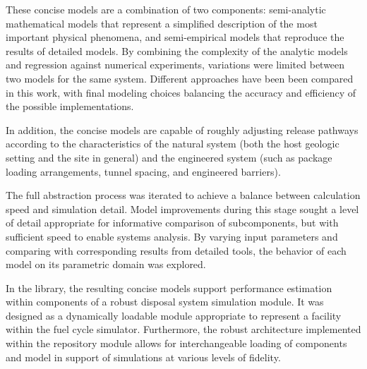 
These concise models are a combination of two components: 
semi-analytic mathematical models that represent a simplified description of 
the most important physical phenomena, and semi-empirical models that reproduce 
the results of detailed models.  By combining the complexity of the analytic 
models and regression against numerical experiments, variations were limited 
between two models for the same system.  Different approaches have been been 
compared in this work, with final modeling choices balancing the accuracy and 
efficiency of the possible implementations.  

In addition, the concise models are capable of roughly adjusting release 
pathways according to the characteristics of the natural system (both the host 
geologic setting and the site in general) and the engineered system (such as package 
loading arrangements, tunnel spacing, and engineered barriers).

The full abstraction process was iterated to achieve a balance between 
calculation speed and simulation detail. Model improvements during this stage 
sought a level of detail appropriate for informative comparison of subcomponents, but 
with sufficient speed to enable systems analysis. 
By varying input parameters and comparing with corresponding results from 
detailed tools, the behavior of each model on its parametric domain was 
explored.

In the \Cyder library, the resulting concise models support performance 
estimation within components of a robust disposal system simulation module. It 
was designed as a dynamically loadable module appropriate to represent a 
facility within the \Cyclus fuel cycle simulator. Furthermore, the robust 
architecture implemented within the repository module allows for 
interchangeable loading of components and model in support of simulations at 
various levels of fidelity.




%


